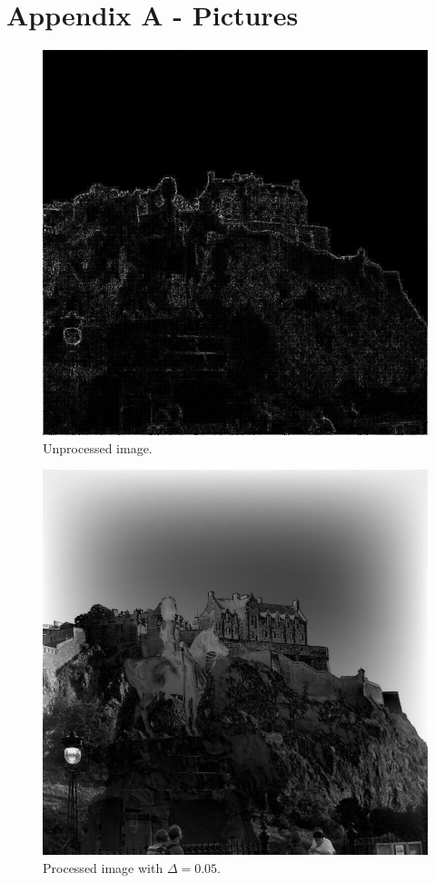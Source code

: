\documentclass[11pt]{article}
\begin{document}
	\pagebreak
	\section{Appendix A - Pictures}
	
	\begin{figure}[H]	
		\centering
		\includegraphics[scale=0.23]{edge768x768.jpg}
		\caption{Unprocessed image.}\label{pic0}
	\end{figure}
	
	\begin{figure}[H]	
		\centering
		\includegraphics[scale=0.23]{edge768x768_050.jpg}
		\caption{Processed image with $\Delta=0.05$.}\label{pic5}
	\end{figure}
\end{document}
